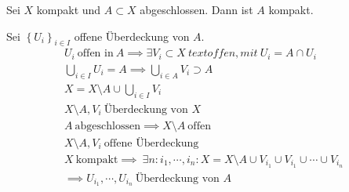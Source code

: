 \begin{Sat}
  Sei $X$ kompakt und $A\subset X$ abgeschlossen. Dann ist $A$ kompakt.
\end{Sat}
\begin{Bew}
  Sei $\left\{ U_i \right\}_{i\in I}$ offene Überdeckung von $A$.
  \begin{gather*}
    U_i\ \text{offen in}\ A\implies \exists V_i\subset X\ text{offen, mit}\ U_i=A\cap U_i\\
    \bigcup_{i\in I}U_i=A \implies \bigcup_{i\in A}V_i\supset A\\
    X=X\setminus A\cup \bigcup_{i\in I}V_i\\
    X\setminus A,V_i\ \text{Überdeckung von $X$}\\
    A\ \text{abgeschlossen}\implies X\setminus A\ \text{offen}\\
    X\setminus A,V_i\ \text{offene Überdeckung}\\
    X\ \text{kompakt}\implies\ \exists n:i_1,\cdots,i_n: X=X\setminus A\cup V_{i_1}\cup V_{i_1}\cup\cdots\cup V_{i_n}\\
    \implies U_{i_1},\cdots,U_{i_n}\ \text{Überdeckung von $A$}
  \end{gather*}
\end{Bew}
